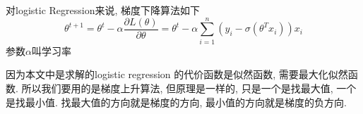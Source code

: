 对logistic Regression来说, 梯度下降算法如下
$$
\theta^{t + 1}
= \theta^t - \alpha \frac{\partial L(\theta)}{\partial \theta}
= \theta^t - \alpha \sum_{i = 1}^n (y_i - \sigma(\theta^T x_i)) x_i
$$
参数$\alpha$叫学习率

因为本文中是求解的logistic regression 的代价函数是似然函数, 需要最大化似然函数. 所以我们要用的是梯度上升算法, 但原理是一样的, 只是一个是找最大值, 一个是找最小值.
找最大值的方向就是梯度的方向, 最小值的方向就是梯度的负方向.

